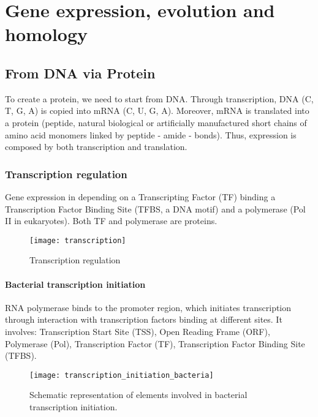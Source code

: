\chapter{Gene expression, evolution and homology}

\section{From DNA via Protein}

To create a protein, we need to start from DNA. Through transcription, DNA (C,
T, G, A) is copied into mRNA (C, U, G, A). Moreover, mRNA is translated into a
protein (peptide, natural biological or artificially manufactured short chains
of amino acid monomers linked by peptide - amide - bonds). Thus, expression is
composed by both transcription and translation.

\subsection{Transcription regulation}

Gene expression in depending on a Transcripting Factor (TF) binding a Transcription
Factor Binding Site (TFBS, a DNA motif) and a polymerase (Pol II in eukaryotes).
Both TF and polymerase are proteins.

\begin{figure}[!htpb]
\centering
\texttt{[image: transcription]}
\caption{Transcription regulation}
\label{Transcritpion regulation}
\end{figure}

\subsubsection{Bacterial transcription initiation}

RNA polymerase binds to the promoter region, which initiates transcription
through interaction with transcription factors binding at different sites.
It involves: Transcription Start Site (TSS), Open Reading Frame (ORF),
Polymerase (Pol), Transcription Factor (TF), Transcription Factor Binding Site
(TFBS).

\begin{figure}[!htpb]
\centering
\texttt{[image: transcription\_initiation\_bacteria]}
\caption{Schematic representation of elements involved in bacterial transcription initiation.}
\label{Transcritpion initiation in bacteria}
\end{figure}

